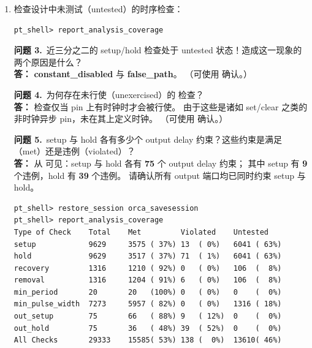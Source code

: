 \begin{enumerate}
\begin{questionBox}
\begin{lstlisting}
sd_CKn
sd_CK
\end{lstlisting}
上述警告可忽略——这 2 个是时钟输出端口（可用  确认），不应施加 output delay 约束。
\end{questionBox}

  \item 检查设计中未测试（untested）的时序检查：
\begin{lstlisting}
pt_shell> report_analysis_coverage
\end{lstlisting}

\begin{questionBox}
\textbf{问题 3.}\ 近三分之二的 setup/hold 检查处于 untested 状态！造成这一现象的两个原因是什么？\\[0.35em]
\textbf{答：} \textbf{constant\_disabled} 与 \textbf{false\_path}。
（可使用  确认。）

\textbf{问题 4.}\ 为何存在未行使（unexercised）的  检查？\\[0.35em]
\textbf{答：}  检查仅当 pin 上有时钟时才会被行使。
由于这些是诸如 set/clear 之类的非时钟异步 pin，未在其上定义时钟。
（可使用  确认。）

\textbf{问题 5.}\ setup 与 hold 各有多少个 output delay 约束？这些约束是满足（met）还是违例（violated）？\\[0.35em]
\textbf{答：} 从  可见：setup 与 hold 各有 \textbf{75} 个 output delay 约束；
其中 setup 有 \textbf{9} 个违例，hold 有 \textbf{39} 个违例。
请确认所有 output 端口均已同时约束 setup 与 hold。
\begin{lstlisting}
pt_shell> restore_session orca_savesession
pt_shell> report_analysis_coverage
Type of Check    Total    Met         Violated    Untested
setup            9629     3575 ( 37%) 13  ( 0%)   6041 ( 63%)
hold             9629     3517 ( 37%) 71  ( 1%)   6041 ( 63%)
recovery         1316     1210 ( 92%) 0   ( 0%)   106  (  8%)
removal          1316     1204 ( 91%) 6   ( 0%)   106  (  8%)
min_period       20       20   (100%) 0   ( 0%)   0    (  0%)
min_pulse_width  7273     5957 ( 82%) 0   ( 0%)   1316 ( 18%)
out_setup        75       66   ( 88%) 9   ( 12%)  0    (  0%)
out_hold         75       36   ( 48%) 39  ( 52%)  0    (  0%)
All Checks       29333    15585( 53%) 138 (  0%)  13610( 46%)
\end{lstlisting}
\end{questionBox}
\end{enumerate}

